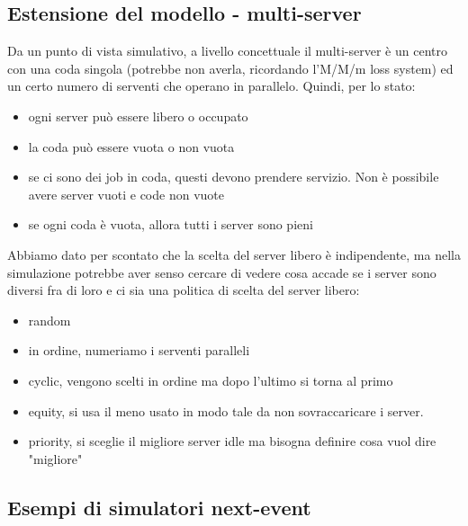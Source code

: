 \documentclass{article}
\begin{document}
\subsection{Estensione del modello - multi-server}
Da un punto di vista simulativo, a livello concettuale il multi-server è un centro con una coda singola (potrebbe non averla, ricordando l'M/M/m loss system) ed un certo numero di serventi che operano in parallelo. Quindi, per lo stato:
\begin{itemize}
\item ogni server può essere libero o occupato
\item la coda può essere vuota o non vuota
\item se ci sono dei job in coda, questi devono prendere servizio. Non è possibile avere server vuoti e code non vuote
\item se ogni coda è vuota, allora tutti i server sono pieni
\end{itemize}
Abbiamo dato per scontato che la scelta del server libero è indipendente, ma nella simulazione potrebbe aver senso cercare di vedere cosa accade se i server sono diversi fra di loro e ci sia una politica di scelta del server libero:
\begin{itemize}
\item random
\item in ordine, numeriamo i serventi paralleli
\item cyclic, vengono scelti in ordine ma dopo l'ultimo si torna al primo
\item equity, si usa il meno usato in modo tale da non sovraccaricare i server.
\item priority, si sceglie il migliore server idle ma bisogna definire cosa vuol dire  "migliore"
\end{itemize}
\subsection{Esempi di simulatori next-event}
\end{document}
